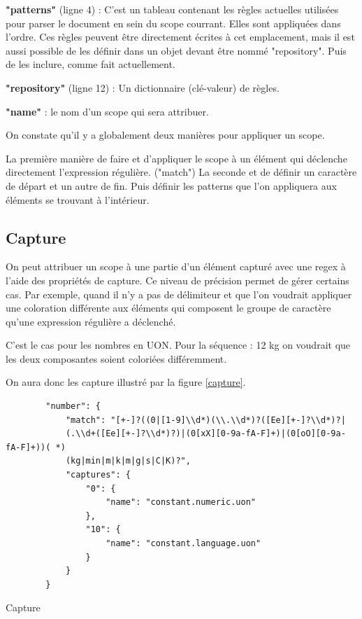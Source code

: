 \documentclass[
    iict, %
    il, %
]{heig-tb}
\begin{document}
\textbf{"patterns"} (ligne 4) :
C'est un tableau contenant les règles actuelles utilisées pour parser le document en sein du scope courrant.
Elles sont appliquées dans l'ordre.
Ces règles peuvent être directement écrites à cet emplacement, mais il est aussi possible de les définir dans un objet devant être nommé "repository". Puis de les inclure, comme fait actuellement.

\textbf{"repository"} (ligne 12) : Un dictionnaire (clé-valeur) de règles.

\textbf{"name"} : le nom d'un scope qui sera attribuer.

On constate qu'il y a globalement deux manières pour appliquer un scope.

La première manière de faire et d'appliquer le scope à un élément qui déclenche directement l'expression régulière. ("match")
La seconde et de définir un caractère de départ et un autre de fin. Puis définir les patterns que l'on appliquera aux éléments se trouvant à l'intérieur.

\subsection{Capture}

On peut attribuer un scope à une partie d'un élément capturé avec une regex à l'aide des propriétés de capture.
Ce niveau de précision permet de gérer certains cas. Par exemple, quand il n'y a pas de délimiteur et que l'on voudrait appliquer une coloration différente aux éléments qui composent le groupe de caractère qu'une expression régulière
a déclenché.

C'est le cas pour les nombres en UON. Pour la séquence : 12 kg on voudrait que les deux composantes soient coloriées différemment.

On aura donc les capture illustré par la figure \ref{capture}.

\begin{listing}[!ht]
    \begin{verbatim}
        "number": {
            "match": "[+-]?((0|[1-9]\\d*)(\\.\\d*)?([Ee][+-]?\\d*)?|
            (.\\d+([Ee][+-]?\\d*)?)|(0[xX][0-9a-fA-F]+)|(0[oO][0-9a-fA-F]+))( *)
            (kg|min|m|k|m|g|s|C|K)?",
            "captures": {
                "0": {
                    "name": "constant.numeric.uon"
                },
                "10": {
                    "name": "constant.language.uon"
                }
            }
        }
    \end{verbatim}
    \caption{Capture}
    \label{capture}
\end{listing}
\end{document}
